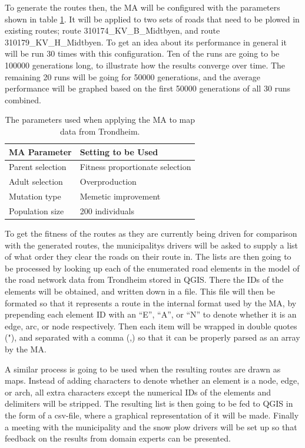 To generate the routes then, the MA will be configured with the parameters shown in table \ref{tab:trondheim_params_table}. It will be applied to two sets of roads that need to be plowed in existing routes; route 310174\_KV\_B\_Midtbyen, and route 310179\_KV\_H\_Midtbyen. To get an idea about its performance in general it will be run 30 times with this configuration. Ten of the runs are going to be 100000 generations long, to illustrate how the results converge over time. The remaining 20 runs will be going for 50000 generations, and the average performance will be graphed based on the first 50000 generations of all 30 runs combined.

{
\begin{table}[tbph]
\centering
\begin{tabular}{ll}
\toprule
\textbf{MA Parameter} & \textbf{Setting to be Used}     \\ \midrule
Parent selection      & Fitness proportionate selection \\
Adult selection       & Overproduction                  \\
Mutation type         & Memetic improvement             \\
Population size       & 200 individuals                 \\ \bottomrule
\end{tabular}
\caption{The parameters used when applying the MA to map data from Trondheim.}
\label{tab:trondheim_params_table}
\end{table}
}

To get the fitness of the routes as they are currently being driven for comparison with the generated routes, the municipalitys drivers will be asked to supply a list of what order they clear the roads on their route in. The lists are then going to be processed by looking up each of the enumerated road elements in the model of the road network data from Trondheim stored in QGIS. There the IDs of the elements will be obtained, and written down in a file. This file will then be formated so that it represents a route in the internal format used by the MA, by prepending each element ID with an \enquote{E}, \enquote{A}, or \enquote{N} to denote whether it is an edge, arc, or node respectively. Then each item will be wrapped in double quotes ("), and separated with a comma (,) so that it can be properly parsed as an array by the MA.

A similar process is going to be used when the resulting routes are drawn as maps. Instead of adding characters to denote whether an element is a node, edge, or arch, all extra characters except the numerical IDs of the elements and delimiters will be stripped. The resulting list is then going to be fed to QGIS in the form of a csv-file, where a graphical representation of it will be made. Finally a meeting with the municipality and the snow plow drivers will be set up so that feedback on the results from domain experts can be presented.

